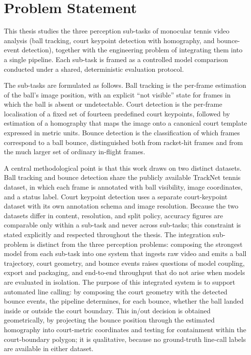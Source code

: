 \section{Problem Statement}
\label{sec:intro-problem}

This thesis studies the three perception sub-tasks of monocular tennis video
analysis (ball tracking, court keypoint detection with homography, and
bounce-event detection), together with the engineering problem of integrating
them into a single pipeline. Each sub-task is framed as a controlled model
comparison conducted under a shared, deterministic evaluation protocol.

The sub-tasks are formulated as follows. Ball tracking is the per-frame
estimation of the ball's image position, with an explicit ``not visible'' state
for frames in which the ball is absent or undetectable. Court detection is the
per-frame localisation of a fixed set of fourteen predefined court keypoints,
followed by estimation of a homography that maps the image onto a canonical
court template expressed in metric units. Bounce detection is the
classification of which frames correspond to a ball bounce, distinguished both
from racket-hit frames and from the much larger set of ordinary in-flight
frames.

A central methodological point is that this work draws on two distinct
datasets. Ball tracking and bounce detection share the publicly available
TrackNet tennis dataset, in which each frame is annotated with ball visibility,
image coordinates, and a status label. Court keypoint detection uses a separate
court-keypoint dataset with its own annotation schema and image resolution.
Because the two datasets differ in content, resolution, and split policy,
accuracy figures are comparable only within a sub-task and never across
sub-tasks; this constraint is stated explicitly and respected throughout the
thesis. The integration sub-problem is distinct from the three perception
problems: composing the strongest model from each sub-task into one system that
ingests raw video and emits a ball trajectory, court geometry, and bounce events
raises questions of model coupling, export and packaging, and end-to-end
throughput that do not arise when models are evaluated in isolation. The
purpose of this integrated system is to support automated line calling: by
composing the court geometry with the detected bounce events, the pipeline
determines, for each bounce, whether the ball landed inside or outside the
court boundary. This in/out decision is obtained geometrically, by projecting
the bounce position through the estimated homography into court-metric
coordinates and testing for containment within the court-boundary polygon; it
is qualitative, because no ground-truth line-call labels are available in
either dataset.

